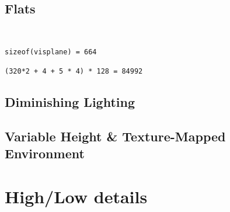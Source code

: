 \subsection{Flats}
\\
\par
\begin{verbatim}
sizeof(visplane) = 664

(320*2 + 4 + 5 * 4) * 128 = 84992
\end{verbatim}

\subsection{Diminishing Lighting}

\subsection{Variable Height \& Texture-Mapped Environment}

\section{High/Low details}

\\
\\